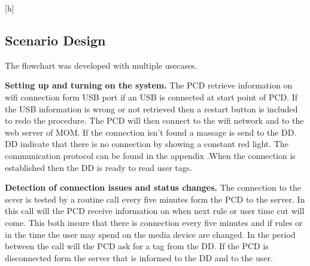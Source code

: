 \begin{center}[h]
\subsection{Scenario Design}


The flowchart was developed with multiple usecases.\newline


\textbf{Setting up and turning on the system.} \newline
The PCD retrieve information on wifi connection form USB port if an USB is connected at start point of PCD. 
If the USB information is wrong or not retrieved then a restart button is included to redo the procedure.  \newline
The PCD will then connect to the wifi network and to the web server of MOM. If the connection isn't found a massage is send to the DD. \newline DD indicate that there is no connection by showing a constant red light. The communication protocol can be found in the appendix  .\newline When the connection is established then the DD is ready to read user tags.\newline

\textbf{Detection of connection issues and status changes.} \newline
The connection to the sever is tested by a routine call every five minutes form the PCD to the server. In this call will the PCD receive information on when next rule or user time cut will come. This both insure that there is connection every five minutes and if rules or in the time the user may spend on the media device are changed. In the period between the call will the PCD ask for a tag from the DD. If the PCD is disconnected form the server that is informed to the DD and to the user.  \newline
	

\end{center}
